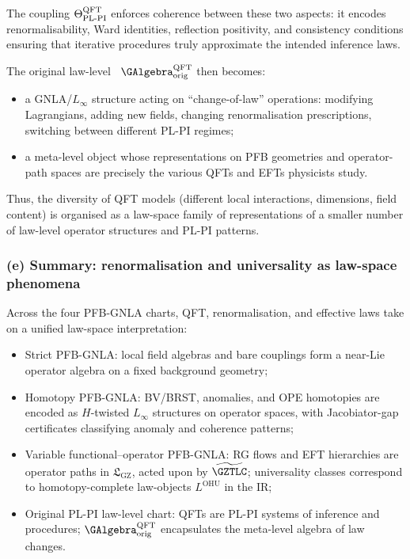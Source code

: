 \documentclass[11pt]{book}
\theoremstyle{plain}
\theoremstyle{definition}
\newcommand{\GZLS}{\ensuremath{\mathfrak{L}_{\mathrm{GZ}}}}       \newcommand{\GZLT}{\ensuremath{M_{!w}}}                           \newcommand{\GZLOC}{\ensuremath{A_M}}                             \newcommand{\GZLCurv}{\ensuremath{\mathcal{F}_{\mathrm{law}}}}
\begin{document}
The coupling $\Theta_{\mathrm{PL\text- PI}}^{\mathrm{QFT}}$ enforces
coherence between these two aspects: it encodes renormalisability,
Ward identities, reflection positivity, and consistency conditions
ensuring that iterative procedures truly approximate the intended
inference laws.

The original law-level \GAlgebra\ $\GAlgebra_{\mathrm{orig}}^{\mathrm{QFT}}$
then becomes:

\begin{itemize}
  \item a GNLA/$L_\infty$ structure acting on “change-of-law”
        operations: modifying Lagrangians, adding new fields,
        changing renormalisation prescriptions, switching between
        different PL-PI regimes;
  \item a meta-level object whose representations on PFB geometries and
        operator-path spaces are precisely the various QFTs and EFTs
        physicists study.
\end{itemize}

Thus, the diversity of QFT models (different local interactions,
dimensions, field content) is organised as a law-space family of
representations of a smaller number of law-level operator structures
and PL-PI patterns.



\subsubsection*{(e) Summary: renormalisation and universality as law-space phenomena}

Across the four PFB-GNLA charts, QFT, renormalisation, and effective
laws take on a unified law-space interpretation:

\begin{itemize}
  \item Strict PFB-GNLA: local field algebras and bare couplings form a
        near-Lie operator algebra on a fixed background geometry;
  \item Homotopy PFB-GNLA: BV/BRST, anomalies, and OPE homotopies are
        encoded as $H$-twisted $L_\infty$ structures on operator
        spaces, with Jacobiator-gap certificates classifying anomaly
        and coherence patterns;
  \item Variable functional--operator PFB-GNLA: RG flows and EFT
        hierarchies are operator paths in $\GZLS$, acted upon by
        $\widetilde{\GZTLC}$; universality classes correspond to
        homotopy-complete law-objects $L^{\mathrm{OHU}}$ in the IR;
  \item Original PL-PI law-level chart: QFTs are PL-PI systems of
      inference and procedures; \(\GAlgebra_{\mathrm{orig}}^{\mathrm{QFT}}\)
      encapsulates the meta-level algebra of law changes.
\end{itemize}
\end{document}
